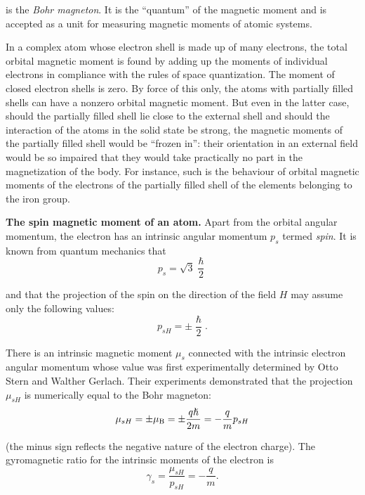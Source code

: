 \noindent
is the \textit{Bohr magneton}. It is the ``quantum'' of the magnetic moment and is accepted as a unit for measuring magnetic moments of atomic systems.

In a complex atom whose electron shell is made up of many electrons, the total orbital magnetic moment is found by adding up the moments of individual electrons in compliance with the rules of space quantization. The moment of closed electron shells is zero. By force of this only, the atoms with partially filled shells can have a nonzero orbital magnetic moment. But even in the latter case, should the partially filled shell lie close to the external shell and should the interaction of the atoms in the solid state be strong, the magnetic moments of the partially filled shell would be ``frozen in'': their orientation in an external field would be so impaired that they would take practically no part in the magnetization of the body. For instance, such is the behaviour of orbital magnetic moments of the electrons of the partially filled  shell of the elements belonging to the iron group.

\textbf{The spin magnetic moment of an atom.} Apart from the orbital angular momentum, the electron has an intrinsic angular momentum $p_s$ termed \textit{spin}. It is known from quantum mechanics that
\begin{equation}\label{eq:7_23}
    p_s = \sqrt{3} \frac{\hslash}{2}
\end{equation}

\noindent
and that the projection of the spin on the direction of the field $H$ may assume only the following values:
\begin{equation}\label{eq:7_24}
    p_{sH} = \pm \frac{\hslash}{2}.
\end{equation}

There is an intrinsic magnetic moment $\mu_s$ connected with the intrinsic electron angular momentum whose value was first experimentally determined by Otto Stern and Walther Gerlach. Their experiments demonstrated that the projection $\mu_{sH}$ is numerically equal to the Bohr magneton:
\begin{equation}\label{eq:7_25}
    \mu_{sH} = \pm \mu_{\text{B}} = \pm \frac{q\hslash}{2m} = - \frac{q}{m} p_{sH}
\end{equation}

\noindent
(the minus sign reflects the negative nature of the electron charge). The gyromagnetic ratio for the intrinsic moments of the electron is
\begin{equation}\label{eq:7_26}
    \gamma_s = \frac{\mu_{sH}}{p_{sH}} = - \frac{q}{m}.
\end{equation}

